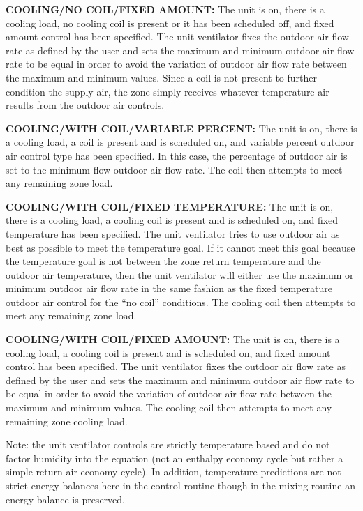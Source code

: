\textbf{COOLING/NO COIL/FIXED AMOUNT:} The unit is on, there is a cooling load, no cooling coil is present or it has been scheduled off, and fixed amount control has been specified. The unit ventilator fixes the outdoor air flow rate as defined by the user and sets the maximum and minimum outdoor air flow rate to be equal in order to avoid the variation of outdoor air flow rate between the maximum and minimum values. Since a coil is not present to further condition the supply air, the zone simply receives whatever temperature air results from the outdoor air controls.

\textbf{COOLING/WITH COIL/VARIABLE PERCENT:} The unit is on, there is a cooling load, a coil is present and is scheduled on, and variable percent outdoor air control type has been specified. In this case, the percentage of outdoor air is set to the minimum flow outdoor air flow rate. The coil then attempts to meet any remaining zone load.

\textbf{COOLING/WITH COIL/FIXED TEMPERATURE:} The unit is on, there is a cooling load, a cooling coil is present and is scheduled on, and fixed temperature has been specified. The unit ventilator tries to use outdoor air as best as possible to meet the temperature goal. If it cannot meet this goal because the temperature goal is not between the zone return temperature and the outdoor air temperature, then the unit ventilator will either use the maximum or minimum outdoor air flow rate in the same fashion as the fixed temperature outdoor air control for the ``no coil'' conditions. The cooling coil then attempts to meet any remaining zone load.

\textbf{COOLING/WITH COIL/FIXED AMOUNT:} The unit is on, there is a cooling load, a cooling coil is present and is scheduled on, and fixed amount control has been specified. The unit ventilator fixes the outdoor air flow rate as defined by the user and sets the maximum and minimum outdoor air flow rate to be equal in order to avoid the variation of outdoor air flow rate between the maximum and minimum values. The cooling coil then attempts to meet any remaining zone cooling load.

Note: the unit ventilator controls are strictly temperature based and do not factor humidity into the equation (not an enthalpy economy cycle but rather a simple return air economy cycle). In addition, temperature predictions are not strict energy balances here in the control routine though in the mixing routine an energy balance is preserved.

